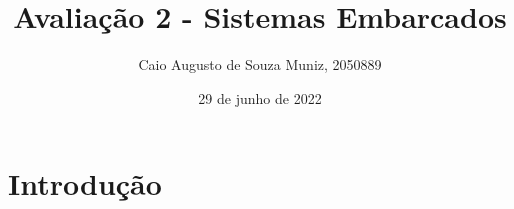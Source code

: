 \documentclass{exam}
\title{Avaliação 2 - Sistemas Embarcados}
\author{Caio Augusto de Souza Muniz, 2050889}
\date{29 de junho de 2022}
\begin{document}
\section{Introdução}
\end{document}
